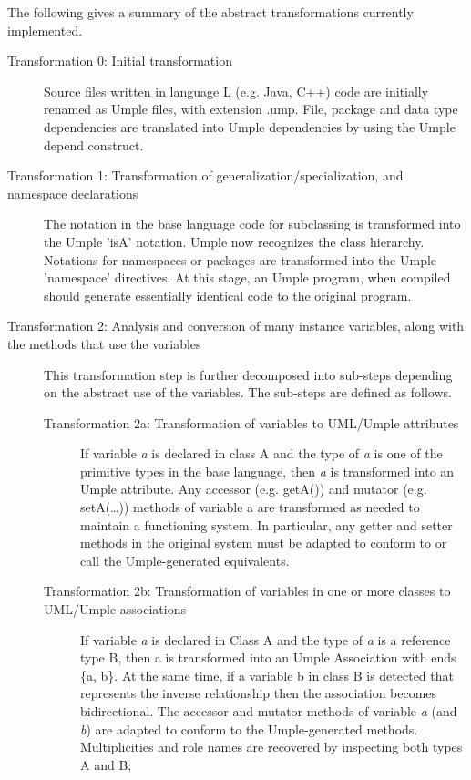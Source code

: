 The following gives a summary of the abstract transformations currently implemented. 
\begin{description} 
\item[Transformation 0: Initial transformation] 
Source files written in language L (e.g. Java, C++) code are initially renamed as Umple files, with extension .ump. File, package and data type dependencies are translated into Umple dependencies by using the Umple depend construct. 

\item [Transformation 1: Transformation of generalization/specialization, and namespace declarations]
The notation in the base language code for subclassing is transformed into the Umple 'isA' notation. Umple now recognizes the class hierarchy. Notations for namespaces or packages are transformed into the Umple 'namespace' directives. At this stage, an Umple program, when compiled should generate essentially identical code to the original program.

\item [Transformation 2: Analysis and conversion of many instance variables, along with the methods that use the variables]
This transformation step is further decomposed into sub-steps depending on the abstract use of the variables. The sub-steps are defined as follows.
	\begin{description}

	\item [Transformation 2a: Transformation of variables to UML/Umple attributes]
	If variable \textit{a} is declared in class A and the type of \textit{a} is one of the primitive types in the base language, then \textit{a} is transformed into an Umple attribute. Any accessor (e.g. getA()) and mutator (e.g. setA(…)) methods of variable a are transformed as needed to maintain a functioning system. In particular, any getter and setter methods in the original system must be adapted to conform to or call the Umple-generated equivalents.
	
	\item [Transformation 2b: Transformation of variables in one or more classes to UML/Umple associations]
	If variable \textit{a} is declared in Class A and the type of \textit{a} is a reference type B, then a is transformed into an Umple Association with ends \{a, b\}. At the same time, if a variable b in class B is detected that represents the inverse relationship then the association becomes bidirectional. The accessor and mutator methods of variable \textit{a} (and \textit{b}) are adapted to conform to the Umple-generated methods. Multiplicities and role names are recovered by inspecting both types A and B;


\end{description}
\end{description}
